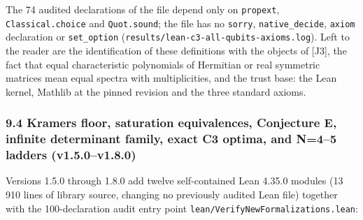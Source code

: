 \documentclass[11pt,a4paper]{article}
\begin{document}
The 74 audited declarations of the file depend only on \texttt{propext}, \texttt{Classical.choice} and
\texttt{Quot.sound}; the file has no \texttt{sorry}, \texttt{native\_decide}, \texttt{axiom} declaration or \texttt{set\_option}
(\nolinkurl{results/lean-c3-all-qubits-axioms.log}). Left to the reader are the identification of these
definitions with the objects of {[}J3{]}, the fact that equal characteristic polynomials of Hermitian or
real symmetric matrices mean equal spectra with multiplicities, and the trust base: the Lean kernel,
Mathlib at the pinned revision and the three standard axioms.

\subsubsection{9.4 Kramers floor, saturation equivalences, Conjecture E, infinite determinant family, exact C3 optima, and N=4--5 ladders (v1.5.0--v1.8.0)}\label{94-kramers-floor-saturation-equivalences-conjecture-e-infinite-determinant-family-exact-c3-optima-and-n45-ladders-v150v180}

Versions 1.5.0 through 1.8.0 add twelve self-contained Lean 4.35.0 modules (13 910 lines of library
source, changing no previously audited Lean file) together with the 100-declaration audit entry point
\nolinkurl{lean/VerifyNewFormalizations.lean}:
\end{document}
